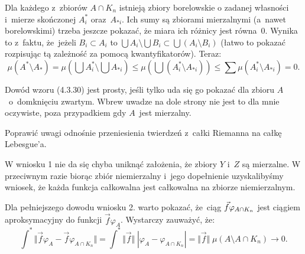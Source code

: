 \documentclass[a4paper,11pt]{article}
\numberwithin{equation}{section}
\begin{document}
\noindent
{} Dla każdego z~zbiorów $A \cap K_{ n }$ istnieją
zbiory borelowskie o zadanej własności i~mierze skończonej
$A_{ i }^{ * }$ oraz~$A_{ * i }$. Ich sumy są zbiorami mierzalnymi
(a~nawet borelowskimi) trzeba jeszcze pokazać, że miara ich różnicy
jest równa~0. Wynika to z~faktu, że~jeżeli $B_{ i } \subset A_{ i }$
to $\bigcup A_{ i } \setminus \bigcup B_{ i } \subset \bigcup ( A_{ i } \setminus B_{ i } )$ (łatwo to pokazać
rozpisując tą zależność za pomocą kwantyfikatorów). Teraz:
\begin{equation}
  \label{eq:SchwartzKAMVolI-06}
  \mu( A^{ * } \setminus A_{ * } ) = \mu\left( \bigcup A^{ * }_{ i } \setminus \bigcup A_{ * i } \right)
  \leq \mu\left( \bigcup ( A^{ * }_{ i } \setminus A_{ * i } ) \right)
  \leq \sum \mu( A^{ * }_{ i } \setminus A_{ * i } ) = 0.
\end{equation}

\VerSpaceFour





\noindent
{} Dowód wzoru (4.3.30) jest prosty, jeśli tylko uda się
go pokazać dla zbioru $A$~o~domknięciu zwartym. Wbrew uwadze na dole
strony nie jest to dla mnie oczywiste, poza przypadkiem gdy $A$~jest
mierzalny.

\VerSpaceFour





\noindent
{} Poprawić uwagi odnośnie przeniesienia twierdzeń z~całki
Riemanna na całkę Lebesgue’a.

\VerSpaceFour





\noindent
{} W wniosku 1 nie da się chyba uniknąć założenia, że
zbiory $Y$ i~$Z$ są mierzalne. W przeciwnym razie biorąc zbiór
niemierzalny i~jego dopełnienie uzyskalibyśmy wniosek, że każda
funkcja całkowalna jest całkowalna na zbiorze niemierzalnym.

\VerSpaceFour





\noindent
{} Dla pełniejszego dowodu wniosku 2. warto pokazać, że~ciąg
$\vec{f} \varphi_{ A \cap K_{ n } }$ jest ciągiem
aproksymacyjny do funkcji $\vec{ f } \varphi_{ A }$. Wystarczy
zauważyć, że:
\begin{equation}
  \label{eq:SchwartzKAMVolI-07}
  \int^{ * } \Vert \vec{ f } \varphi_{ A } - \vec{ f } \varphi_{ A \cap K_{ n } } \Vert
  = \int^{ * } \Vert \vec{ f } \Vert \; | \varphi_{ A } - \varphi_{ A \cap K_{ n } } |
  = \Vert \vec{ f } \Vert \; \mu( A \setminus A \cap K_{ n } ) \to 0.
\end{equation}
\end{document}
